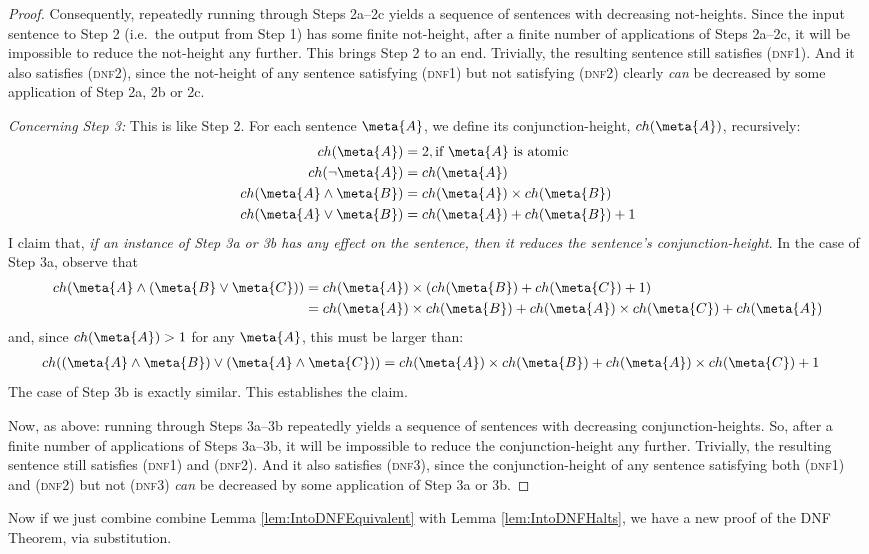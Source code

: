 \begin{lem}
\begin{proof}
		Consequently, repeatedly running through Steps 2a--2c yields a sequence of sentences with decreasing not-heights. Since the input sentence to Step 2 (i.e.\ the output from Step 1) has some finite not-height, after a finite number of applications of Steps 2a--2c, it will be impossible to reduce the not-height any further. This brings Step 2 to an end. Trivially, the resulting sentence still satisfies (\textsc{dnf1}). And it also satisfies (\textsc{dnf2}), since the not-height of any sentence satisfying (\textsc{dnf1}) but not satisfying (\textsc{dnf2}) clearly \emph{can} be decreased by some application of Step 2a, 2b or 2c.
		
		\emph{Concerning Step 3:} This is like Step 2. For each sentence $\meta{A}$, we define its conjunction-height, $ch(\meta{A})$, recursively:
			\begin{align*}
				ch(\meta{A}) &= 2, \text{if }\meta{A}\text{ is atomic}\\
				ch(\lnot \meta{A}) &= ch(\meta{A})\\
				ch(\meta{A} \land \meta{B}) &= ch(\meta{A}) \times ch(\meta{B})\\
				ch(\meta{A} \lor \meta{B}) &=  ch(\meta{A}) + ch(\meta{B}) + 1
			\end{align*}
		I claim that, \emph{if an instance of Step 3a or 3b has any effect on the sentence, then it reduces the sentence's conjunction-height}. In the case of Step 3a, observe that 
			\begin{align*}
				ch(\meta{A} \land (\meta{B} \lor \meta{C})) &= ch(\meta{A}) \times  (ch(\meta{B}) + ch(\meta{C}) + 1)\\
					&= ch(\meta{A})\times ch(\meta{B}) + ch(\meta{A}) \times ch(\meta{C}) + ch(\meta{A})
			\end{align*}
		and, since $ch(\meta{A}) > 1$ for any $\meta{A}$, this must be larger than:
			\begin{align*}
				ch((\meta{A} \land \meta{B}) \lor (\meta{A} \land \meta{C})) &= ch(\meta{A}) \times ch(\meta{B}) + ch(\meta{A}) \times ch(\meta{C}) + 1 
			\end{align*}
		The case of Step 3b is exactly similar. This establishes the claim. 
		
		Now, as above: running through Steps 3a--3b repeatedly yields a sequence of sentences with decreasing conjunction-heights. So, after a finite number of applications of Steps 3a--3b, it will be impossible to reduce the conjunction-height any further. Trivially, the resulting sentence still satisfies (\textsc{dnf1}) and (\textsc{dnf2}). And it also satisfies (\textsc{dnf3}), since the conjunction-height of any sentence satisfying both (\textsc{dnf1}) and (\textsc{dnf2}) but not (\textsc{dnf3}) \emph{can} be decreased by some application of Step 3a or 3b.
	\end{proof}
\end{lem}\noindent
Now if we just combine combine Lemma \ref{lem:IntoDNFEquivalent} with Lemma \ref{lem:IntoDNFHalts}, we have a new proof of the DNF Theorem, via substitution.





